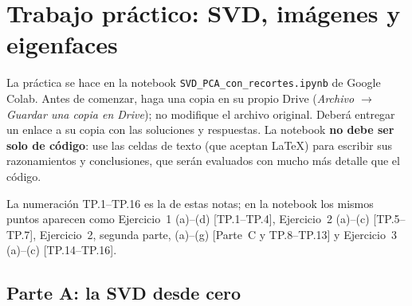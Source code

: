\section*{Trabajo práctico: SVD, imágenes y eigenfaces}\label{pca-sec:tp}

La práctica se hace en la notebook \texttt{SVD\_PCA\_con\_recortes.ipynb} de
Google Colab. Antes de comenzar, haga una copia en su propio Drive
(\emph{Archivo $\to$ Guardar una copia en Drive}); no modifique el archivo
original. Deberá entregar un enlace a su copia con las soluciones y
respuestas. La notebook \textbf{no debe ser solo de código}: use las celdas de
texto (que aceptan \LaTeX) para escribir sus razonamientos y conclusiones, que
serán evaluados con mucho más detalle que el código.

La numeración TP.1--TP.16 es la de estas notas; en la notebook los mismos
puntos aparecen como Ejercicio~1 (a)--(d) [TP.1--TP.4], Ejercicio~2 (a)--(c)
[TP.5--TP.7], Ejercicio~2, segunda parte, (a)--(g) [Parte~C y TP.8--TP.13] y
Ejercicio~3 (a)--(c) [TP.14--TP.16].

\subsection*{Parte A: la SVD desde cero}

